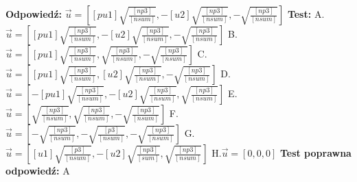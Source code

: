 \documentclass[12pt, a4paper]{article}
\theoremstyle{definition} %
\theoremstyle{definition} %
\newcommand{\rozwStop}{\newline}                                            %
\newcommand{\odpStart}{\noindent \textbf{Odpowiedź:}\newline}    %
\newcommand{\odpStop}{\newline}                                             %
\newcommand{\testStart}{\noindent \textbf{Test:}\newline} %
\newcommand{\testStop}{\newline} %
\newcommand{\kluczStart}{\noindent \textbf{Test poprawna odpowiedź:}\newline} %
\newcommand{\kluczStop}{\newline} %
\begin{document}
\rozwStop


\odpStart
$\vec{u}=\left[[pu1]\sqrt{\frac{[np3]}{[nsum]}},-[u2]\sqrt{\frac{[np3]}{[nsum]}},-\sqrt{\frac{[np3]}{[nsum]}}\right]$
\odpStop
\testStart
A.$\vec{u}=\left[[pu1]\sqrt{\frac{[np3]}{[nsum]}},-[u2]\sqrt{\frac{[np3]}{[nsum]}},-\sqrt{\frac{[np3]}{[nsum]}}\right]$
B.$\vec{u}=\left[[pu1]\sqrt{\frac{[np3]}{[nsum]}},\sqrt{\frac{[np3]}{[nsum]}},-\sqrt{\frac{[np3]}{[nsum]}}\right]$
C.$\vec{u}=\left[[pu1]\sqrt{\frac{[np3]}{[nsum]}},[u2]\sqrt{\frac{[np3]}{[nsum]}},-\sqrt{\frac{[np3]}{[nsum]}}\right]$
D.$\vec{u}=\left[-[pu1]\sqrt{\frac{[np3]}{[nsum]}},-[u2]\sqrt{\frac{[np3]}{[nsum]}},\sqrt{\frac{[np3]}{[nsum]}}\right]$
E.$\vec{u}=\left[\sqrt{\frac{[np3]}{[nsum]}},\sqrt{\frac{[np3]}{[nsum]}},-\sqrt{\frac{[np3]}{[nsum]}}\right]$
F.$\vec{u}=\left[-\sqrt{\frac{[np3]}{[nsum]}},-\sqrt{\frac{[p3]}{[nsum]}},-\sqrt{\frac{[np3]}{[nsum]}}\right]$
G.$\vec{u}=\left[[u1]\sqrt{\frac{[p3]}{[nsum]}},-[u2]\sqrt{\frac{[np3]}{[sum]}},\sqrt{\frac{[np3]}{[nsum]}}\right]$
H.$\vec{u}=[0,0,0]$
\testStop
\kluczStart
A
\kluczStop
\end{document}
